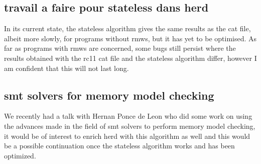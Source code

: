 \documentclass[a4,12pt]{article}
\begin{document}
\subsection{travail a faire pour stateless dans herd}

In its current state, the stateless algorithm gives the same results as the cat file, albeit more slowly, for programs without rmws, but it has yet to be optimised. As far as programs with rmws are concerned, some bugs still persist where the results obtained with the rc11 cat file and the stateless algorithm differ, however I am confident that this will not last long.

\subsection{smt solvers for memory model checking}

We recently had a talk with Hernan Ponce de Leon who did some work on using the advances made in the field of smt solvers to perform memory model checking, it would be of interest to enrich herd with this algorithm as well and this would be a possible continuation once the stateless algorithm works and has been optimized.
\end{document}
